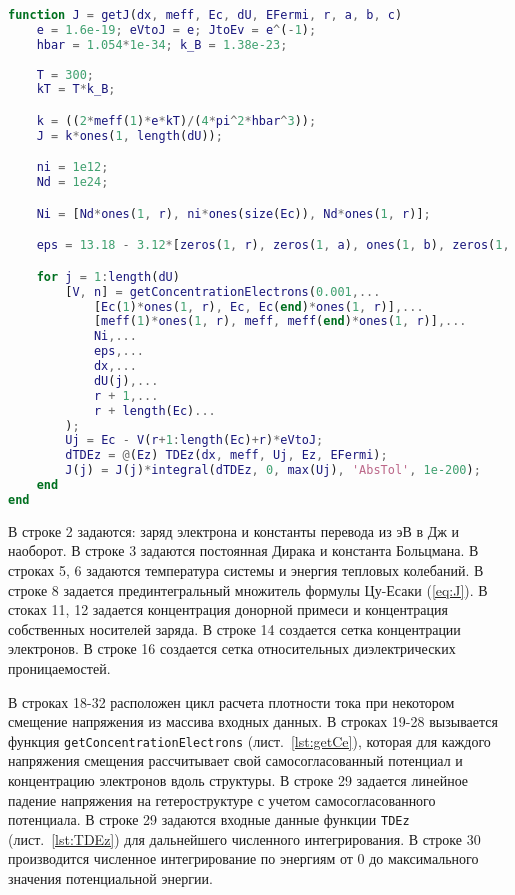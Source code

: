 \begin{lstlisting}[style=realcode,language=Matlab,caption={Расчет плотности тока по формуле Цу-Есаки (\ref{eq:J}) с учетом самосогласованного потенциала},label={lst:JV}]
function J = getJ(dx, meff, Ec, dU, EFermi, r, a, b, c)
	e = 1.6e-19; eVtoJ = e; JtoEv = e^(-1); 
	hbar = 1.054*1e-34; k_B = 1.38e-23;
	
	T = 300;
	kT = T*k_B;

	k = ((2*meff(1)*e*kT)/(4*pi^2*hbar^3));
	J = k*ones(1, length(dU));

	ni = 1e12;
	Nd = 1e24;

	Ni = [Nd*ones(1, r), ni*ones(size(Ec)), Nd*ones(1, r)];

	eps = 13.18 - 3.12*[zeros(1, r), zeros(1, a), ones(1, b), zeros(1, c), ones(1, b), zeros(1, a), zeros(1, r)];

	for j = 1:length(dU)
		[V, n] = getConcentrationElectrons(0.001,...
			[Ec(1)*ones(1, r), Ec, Ec(end)*ones(1, r)],...
			[meff(1)*ones(1, r), meff, meff(end)*ones(1, r)],...
			Ni,...
			eps,...
			dx,...
			dU(j),...
			r + 1,...
			r + length(Ec)...
		);
		Uj = Ec - V(r+1:length(Ec)+r)*eVtoJ;
		dTDEz = @(Ez) TDEz(dx, meff, Uj, Ez, EFermi);
		J(j) = J(j)*integral(dTDEz, 0, max(Uj), 'AbsTol', 1e-200);
	end
end
\end{lstlisting}
В строке 2 задаются: заряд электрона и константы перевода из эВ в Дж и наоборот. В строке 3 задаются постоянная Дирака и константа Больцмана. В строках 5, 6 задаются температура системы и энергия тепловых колебаний. В строке 8 задается прединтегральный множитель формулы Цу-Есаки (\ref{eq:J}). В стоках 11, 12 задается концентрация донорной примеси и концентрация собственных носителей заряда. В строке 14 создается сетка концентрации электронов. В строке 16 создается сетка относительных диэлектрических проницаемостей.

В строках 18-32 расположен цикл расчета плотности тока при некотором смещение напряжения из массива входных данных. В строках 19-28 вызывается функция \texttt{getConcentrationElectrons} (лист.~\ref{lst:getCe}), которая для каждого напряжения смещения рассчитывает свой самосогласованный потенциал и концентрацию электронов вдоль структуры. В строке 29 задается линейное падение напряжения на гетероструктуре с учетом самосогласованного потенциала. В строке 29 задаются входные данные функции \texttt{TDEz} (лист.~\ref{lst:TDEz}) для дальнейшего численного интегрирования. В строке 30 производится численное интегрирование по энергиям от 0 до максимального значения потенциальной энергии.

